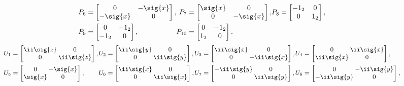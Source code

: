 \begin{unit}
\[\begin{aligned}
\mkern-18mu P_6&=\begin{bmatrix}0&-\sig{x}\\-\sig{x}&0\end{bmatrix},&
\mkern-18mu P_7&=\begin{bmatrix}\sig{x}&0\\0&-\sig{x}\end{bmatrix},&
\mkern-18mu P_8&=\begin{bmatrix}-1_2&0\\0&1_2\end{bmatrix},\\
\mkern-18mu P_9&=\begin{bmatrix}0&-1_2\\-1_2&0\end{bmatrix},&
\mkern-18mu P_{10}&=\begin{bmatrix}0&-1_2\\1_2&0\end{bmatrix}.
\end{aligned}
\]
%
\[\small
\setlength{\arraycolsep}{1pt}
\!\begin{aligned}
\mkern-18mu U_1&=\begin{bmatrix}\ii\sig{z}&0\\0&\ii\sig{z}\end{bmatrix},&
\mkern-18mu U_2&=\begin{bmatrix}\ii\sig{y}&0\\0&\ii\sig{y}\end{bmatrix},&
\mkern-18mu U_3&=\begin{bmatrix}\ii\sig{x}&0\\0&-\ii\sig{x}\end{bmatrix},&
\mkern-18mu U_4&=\begin{bmatrix}0&\ii\sig{x}\\\ii\sig{x}&0\end{bmatrix},\\
\mkern-18mu U_5&=\begin{bmatrix}0&-\sig{x}\\\sig{x}&0\end{bmatrix},&
\mkern-18mu U_6&=\begin{bmatrix}\ii\sig{x}&0\\0&\ii\sig{x}\end{bmatrix},&
\mkern-18mu U_7&=\begin{bmatrix}-\ii\sig{y}&0\\0&\ii\sig{y}\end{bmatrix},&
\mkern-18mu U_8&=\begin{bmatrix}0&-\ii\sig{y}\\-\ii\sig{y}&0\end{bmatrix},\\

\end{aligned}\]
\end{unit}
